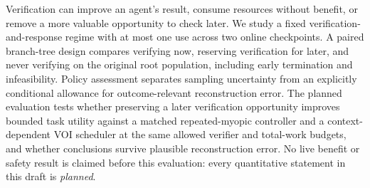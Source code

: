 Verification can improve an agent's result, consume resources without benefit,
or remove a more valuable opportunity to check later.  We study a fixed
verification-and-response regime with at most one use across two online
checkpoints.  A paired branch-tree design compares verifying now, reserving
verification for later, and never verifying on the original root population,
including early termination and infeasibility.  Policy assessment separates
sampling uncertainty from an explicitly conditional allowance for
outcome-relevant reconstruction error.  The planned evaluation tests whether
preserving a later verification opportunity improves bounded task utility
against a matched repeated-myopic controller and a context-dependent VOI
scheduler at the same allowed
verifier and total-work budgets, and whether conclusions survive plausible
reconstruction error.  No live benefit or safety result is claimed before this
evaluation: every quantitative statement in this draft is \emph{planned}.
